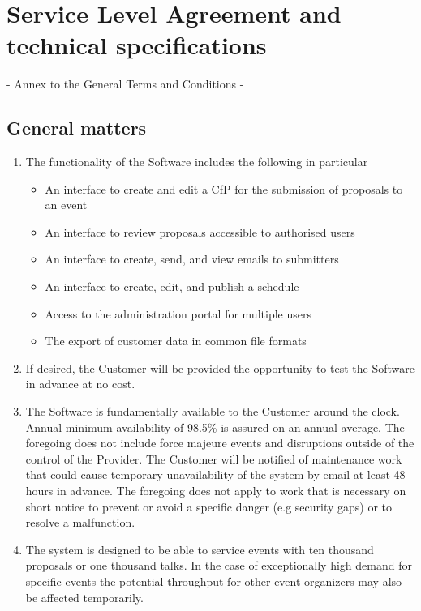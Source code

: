 \documentclass{terms}
\begin{document}
\newpage

\section{Service Level Agreement and technical specifications}
\begin{center}
- Annex to the General Terms and Conditions -
\end{center}

\subsection{General matters}
\begin{enumerate}
\item The functionality of the Software includes the following in particular \begin{itemize}
\item An interface to create and edit a CfP for the submission of proposals to an event
\item An interface to review proposals accessible to authorised users
\item An interface to create, send, and view emails to submitters
\item An interface to create, edit, and publish a schedule
\item Access to the administration portal for multiple users 
\item The export of customer data in common file formats
\end{itemize}
\item If desired, the Customer will be provided the opportunity to test the Software in advance at no cost.
\item The Software is fundamentally available to the Customer around the clock.
      Annual minimum availability of 98.5\% is assured on an annual average.
      The foregoing does not include force majeure events and disruptions outside of the control of the Provider.
      The Customer will be notified of maintenance work that could cause temporary unavailability of the system by email at least 48 hours in advance.
      The foregoing does not apply to work that is necessary on short notice to prevent or avoid a specific danger (e.g security gaps) or to resolve a malfunction.
\item The system is designed to be able to service events with ten thousand proposals or one thousand talks.
      In the case of exceptionally high demand for specific events the potential throughput for other event organizers may also be affected temporarily.

\end{enumerate}
\end{document}
